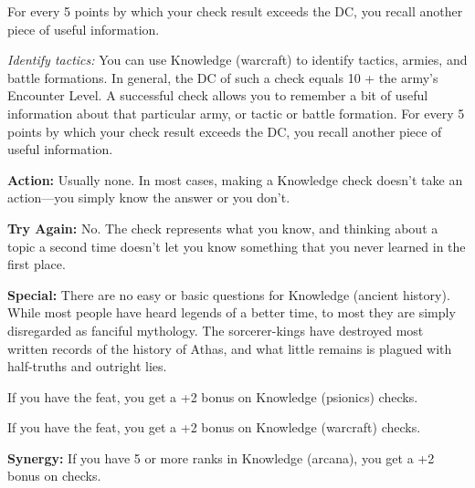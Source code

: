 For every 5 points by which your check result exceeds the DC, you recall another piece of useful information.

\textit{Identify tactics:} You can use Knowledge (warcraft) to identify tactics, armies, and battle formations. In general, the DC of such a check equals 10 + the army's Encounter Level. A successful check allows you to remember a bit of useful information about that particular army, or tactic or battle formation. For every 5 points by which your check result exceeds the DC, you recall another piece of useful information.




\textbf{Action:} Usually none. %
In most cases, making a Knowledge check doesn't take an action---you simply know the answer or you don't.

\textbf{Try Again:} No. The check represents what you know, and thinking about a topic a second time doesn't let you know something that you never learned in the first place.

\textbf{Special:} There are no easy or basic questions for Knowledge (ancient history). While most people have heard legends of a better time, to most they are simply disregarded as fanciful mythology. The sorcerer-kings have destroyed most written records of the history of Athas, and what little remains is plagued with half-truths and outright lies.

If you have the  feat, you get a +2 bonus on Knowledge (psionics) checks.

If you have the  feat, you get a +2 bonus on Knowledge (warcraft) checks.

\textbf{Synergy:} If you have 5 or more ranks in Knowledge (arcana), you get a +2 bonus on  checks.


